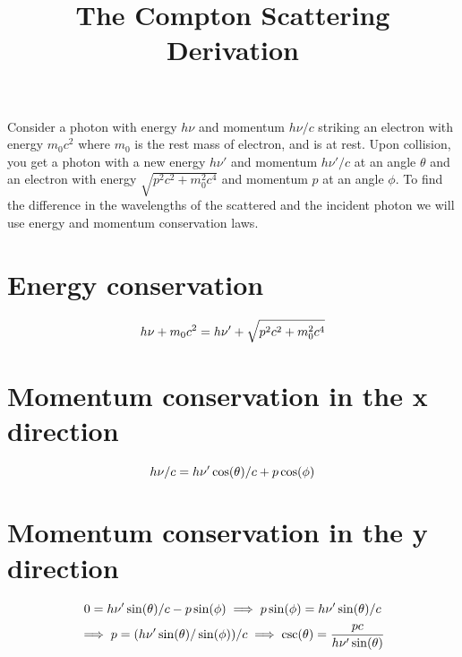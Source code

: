\documentclass{article}
\begin{document}
\title{The Compton Scattering Derivation}
\maketitle
\begin{flushleft}
Consider a photon with energy $h\nu$ and momentum $h\nu/c$ striking an electron with energy $m_0c^2$ where $m_0$ is the rest mass of electron, and is at rest. Upon collision, you get a photon with a new energy $h\nu'$ and momentum $h\nu'/c$ at an angle $\theta$ and an electron with energy $\sqrt{p^2c^2 + m_0^2c^4}$ and momentum $p$ at an angle $\phi$. To find the difference in the wavelengths of the scattered and the incident photon we will use energy and momentum conservation laws. 
\end{flushleft}
\section{Energy conservation}

\begin{equation}
    h\nu + m_0 c^2 = h\nu' + \sqrt{p^2c^2 + m_0^2c^4}  \\
\end{equation}

\section{Momentum conservation in the x direction}

\begin{equation}
    h\nu/c = h\nu'\cos(\theta)/c  + p \cos(\phi) \\
\end{equation}

\section{Momentum conservation in the y direction}

\begin{equation}
    0 = h\nu' \sin(\theta) / c - p \sin(\phi) \\
\implies p \sin(\phi) = h\nu' \sin(\theta) /c \\
\end{equation}
\begin{equation}
\implies p = (h\nu' \sin(\theta) /  \sin(\phi)) /c  \\ 
\implies \csc(\theta) =  \frac{pc}{h\nu' \sin(\theta)}
\end{equation}
\end{document}
